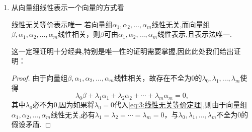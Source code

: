 \begin{enumerate}
\begin{proof}
              \[
                  \lambda_1 \alpha_{i_1} + \lambda_2 \alpha_{i_2} + \cdots + \lambda_k \alpha_{i_k} = 0,
              \]

              则将上式扩充为

              \[
                  \lambda_1 \alpha_{i_1} + \lambda_2 \alpha_{i_2} + \cdots + \lambda_k \alpha_{i_k}  + \lambda_{k+1} \alpha_{i_{k+1}} + \cdots + \lambda_n \alpha_{i_n} = 0,
              \]
              其中 $\lambda_{k+1} = \lambda_{k+2} = \cdots = \lambda_n = 0$, 且 $\lambda_1,\lambda_2,\ldots,\lambda_k$ 不全为零，（即将不在子集中的其它元素以$0$作为系数加到方程中，这样就找到了一个满足线性相关定义的式子）这与 $\{ \alpha_1,\alpha_2,\ldots,\alpha_n \}$ 线性无关矛盾. 故 $\{ \alpha_{i_1},\alpha_{i_2},\ldots,\alpha_{i_k} \}$ 线性无关.

              相同的方法证明后者，设 $\{ \alpha_1,\alpha_2,\ldots,\alpha_n \}$ 线性相关，则存在不全为零的 $\lambda_1,\lambda_2,\ldots,\lambda_n$ 使得

              \[
                  \lambda_1 \alpha_1 + \lambda_2 \alpha_2 + \cdots + \lambda_n \alpha_n = 0,
              \]

              则对于任意包含它的向量组,我们也可以将多出来的向量系数取$0$,这样就找到了一个满足线性相关定义的式子,因此包含它的向量组也线性相关.
          \end{proof}
          总结一下即为：

          如果向量组的一个部分组线性相关，那么整个向量组也线性相关；

          如果向量组线性无关，那么它的任何一个部分组也线性无关.

    \item 从向量组线性表示一个向量的方式看
          \begin{theorem}{}{线性无关等价表示唯一}
              若向量组$\alpha_1,\alpha_2,\ldots,\alpha_m$线性无关,而向量组$\beta,\alpha_1,\alpha_2,\ldots,\alpha_m$线性相关，则$\beta$可由$\alpha_1,\alpha_2,\ldots,\alpha_m$线性表示,且表示法唯一.
          \end{theorem}
          这一定理证明十分经典,特别是唯一性的证明需要掌握,因此此处我们给出证明：

          \begin{proof}
              由于向量组$\beta,\alpha_1,\alpha_2,\ldots,\alpha_m$线性相关，故存在不全为0的$\lambda_0,\lambda_1,\ldots,\lambda_m$使得
              \begin{equation}\label{eq:3:线性无关等价定理}
                  \lambda_0\beta+\lambda_1\alpha_1+\lambda_2\alpha_2+\cdots+\lambda_m\alpha_m=0,
              \end{equation}
              其中$\lambda_0$必不为0,因为如果将$\lambda_0=0$代入\autoref{eq:3:线性无关等价定理},则由于向量组$\alpha_1,\alpha_2,\ldots,\alpha_m$线性无关,必有$\lambda_1=\lambda_2=\cdots=\lambda_m=0$，与$\lambda_0,\lambda_1,\ldots,\lambda_m$不全为0的假设矛盾.


\end{proof}
\end{enumerate}
